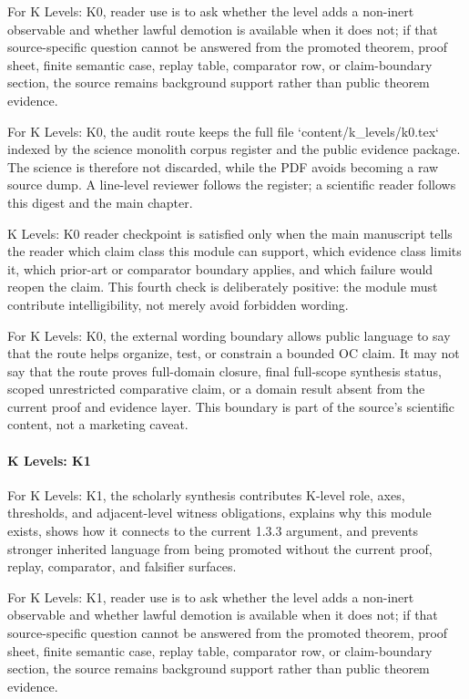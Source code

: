 For K Levels: K0, reader use is to ask whether the level adds a non-inert observable and whether lawful demotion is available when it does not; if that source-specific question cannot be answered from the promoted theorem, proof sheet, finite semantic case, replay table, comparator row, or claim-boundary section, the source remains background support rather than public theorem evidence.


For K Levels: K0, the audit route keeps the full file `content/k\_levels/k0.tex` indexed by the science monolith corpus register and the public evidence package. The science is therefore not discarded, while the PDF avoids becoming a raw source dump. A line-level reviewer follows the register; a scientific reader follows this digest and the main chapter.


K Levels: K0 reader checkpoint is satisfied only when the main manuscript tells the reader which claim class this module can support, which evidence class limits it, which prior-art or comparator boundary applies, and which failure would reopen the claim. This fourth check is deliberately positive: the module must contribute intelligibility, not merely avoid forbidden wording.


For K Levels: K0, the external wording boundary allows public language to say that the route helps organize, test, or constrain a bounded OC claim. It may not say that the route proves full-domain closure, final full-scope synthesis status, scoped unrestricted comparative claim, or a domain result absent from the current proof and evidence layer. This boundary is part of the source's scientific content, not a marketing caveat.


\paragraph{K Levels: K1}

For K Levels: K1, the scholarly synthesis contributes K-level role, axes, thresholds, and adjacent-level witness obligations, explains why this module exists, shows how it connects to the current 1.3.3 argument, and prevents stronger inherited language from being promoted without the current proof, replay, comparator, and falsifier surfaces.


For K Levels: K1, reader use is to ask whether the level adds a non-inert observable and whether lawful demotion is available when it does not; if that source-specific question cannot be answered from the promoted theorem, proof sheet, finite semantic case, replay table, comparator row, or claim-boundary section, the source remains background support rather than public theorem evidence.


